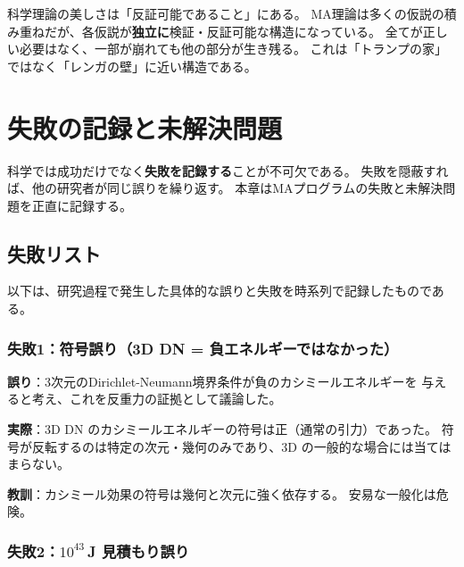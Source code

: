 \begin{hsbox}
科学理論の美しさは「反証可能であること」にある。
MA理論は多くの仮説の積み重ねだが、各仮説が\textbf{独立に}検証・反証可能な構造になっている。
全てが正しい必要はなく、一部が崩れても他の部分が生き残る。
これは「トランプの家」ではなく「レンガの壁」に近い構造である。
\end{hsbox}


\chapter{失敗の記録と未解決問題}
\label{ch:failures}

\begin{warningbox}[本章の精神]
科学では成功だけでなく\textbf{失敗を記録する}ことが不可欠である。
失敗を隠蔽すれば、他の研究者が同じ誤りを繰り返す。
本章はMAプログラムの失敗と未解決問題を正直に記録する。
\end{warningbox}

\section{失敗リスト}
\label{sec:18.1}

以下は、研究過程で発生した具体的な誤りと失敗を時系列で記録したものである。

\subsection{失敗1：符号誤り（3D DN = 負エネルギーではなかった）}

\begin{warningbox}[失敗1: 3D DN の符号]
\textbf{誤り}：3次元のDirichlet-Neumann境界条件が負のカシミールエネルギーを
与えると考え、これを反重力の証拠として議論した。

\medskip
\textbf{実際}：3D DN のカシミールエネルギーの符号は正（通常の引力）であった。
符号が反転するのは特定の次元・幾何のみであり、3D の一般的な場合には当てはまらない。

\medskip
\textbf{教訓}：カシミール効果の符号は幾何と次元に強く依存する。
安易な一般化は危険。
\end{warningbox}

\subsection{失敗2：$10^{43}$\,J 見積もり誤り}

